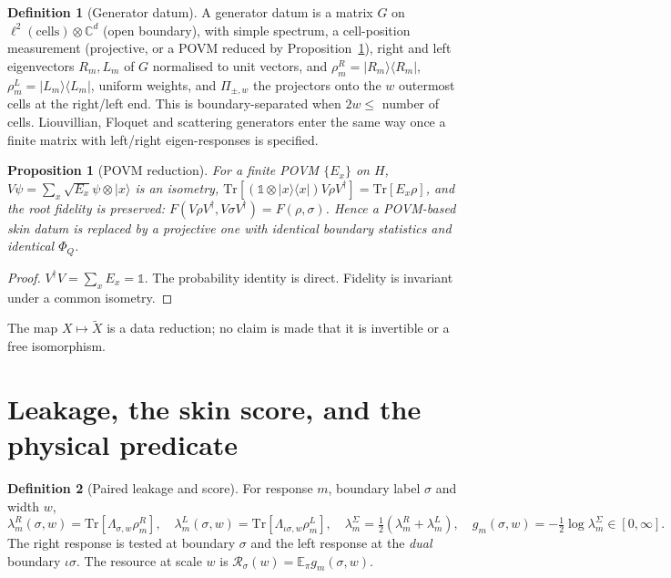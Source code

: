 \documentclass[11pt]{article}
\newtheorem{proposition}[theorem]{Proposition}
\theoremstyle{definition}
\newtheorem{definition}{Definition}
\theoremstyle{remark}
\newcommand{\Tr}{\mathrm{Tr}}
\newcommand{\E}{\mathbb{E}}
\newcommand{\one}{\mathbb{1}}
\begin{document}
\begin{definition}[Generator datum]\label{def:generator}
A generator datum is a matrix $G$ on $\ell^2(\text{cells})\otimes\mathbb{C}^d$ (open boundary), with simple spectrum, a cell-position measurement (projective, or a POVM reduced by Proposition~\ref{prop:naimark}), right and left eigenvectors $R_m,L_m$ of $G$ normalised to unit vectors, and $\rho^R_m=|R_m\rangle\!\langle R_m|$, $\rho^L_m=|L_m\rangle\!\langle L_m|$, uniform weights, and $\Pi_{\pm,w}$ the projectors onto the $w$ outermost cells at the right/left end. This is boundary-separated when $2w\le$ number of cells. Liouvillian, Floquet and scattering generators enter the same way once a finite matrix with left/right eigen-responses is specified.
\end{definition}

\begin{proposition}[POVM reduction]\label{prop:naimark}
For a finite POVM $\{E_x\}$ on $H$, $V\psi=\sum_x\sqrt{E_x}\psi\otimes|x\rangle$ is an isometry, $\Tr[(\one\otimes|x\rangle\!\langle x|)V\rho V^\dagger]=\Tr[E_x\rho]$, and the root fidelity is preserved: $F(V\rho V^\dagger,V\sigma V^\dagger)=F(\rho,\sigma)$. Hence a POVM-based skin datum is replaced by a projective one with identical boundary statistics and identical $\Phi_Q$.
\end{proposition}
\begin{proof}
$V^\dagger V=\sum_xE_x=\one$. The probability identity is direct. Fidelity is invariant under a common isometry.
\end{proof}
\noindent The map $X\mapsto\tilde X$ is a data reduction; no claim is made that it is invertible or a free isomorphism.

\section{Leakage, the skin score, and the physical predicate}
\label{sec:leak}

\begin{definition}[Paired leakage and score]\label{def:leak}
For response $m$, boundary label $\sigma$ and width $w$,
\[
\lambda^R_m(\sigma,w)=\Tr[\Lambda_{\sigma,w}\rho^R_m],\quad
\lambda^L_m(\sigma,w)=\Tr[\Lambda_{\iota\sigma,w}\rho^L_m],\quad
\lambda^\Sigma_m=\tfrac12(\lambda^R_m+\lambda^L_m),\quad
g_m(\sigma,w)=-\tfrac12\log\lambda^\Sigma_m\in[0,\infty].
\]
The right response is tested at boundary $\sigma$ and the left response at the \emph{dual} boundary $\iota\sigma$. The resource at scale $w$ is $\mathcal R_\sigma(w)=\E_\pi g_m(\sigma,w)$.
\end{definition}
\end{document}
